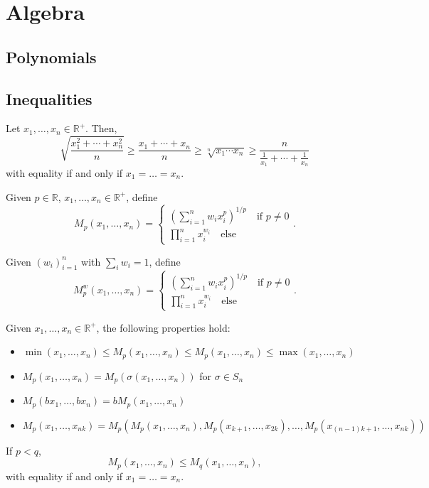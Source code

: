 \documentclass[11pt]{article}
\newcommand{\R}{\mathbb{R}}
\renewcommand{\>}{\rangle}
\newcommand{\<}{\langle}
\begin{document}
\pagebreak
\section{Algebra}
\subsection{Polynomials}
\subsection{Inequalities}
\begin{theorem}[QM-AM-GM-HM]
Let $x_1, \dots, x_n \in \R^+$.  Then,
\[\sqrt{\frac{x_1^2+\cdots+x_n^2}{n}} \ge\frac{x_1+\cdots+x_n}{n}\ge\sqrt[n]{x_1\cdots x_n}\ge\frac{n}{\frac{1}{x_1}+\cdots+\frac{1}{x_n}}\]
with equality if and only if $x_1 = \dots = x_n$.
\end{theorem}

\begin{definition} Given $p \in \R$, $x_1, \dots, x_n \in \R^+$, define 
$$M_p(x_1, \dots, x_n) = \begin{cases}\left (\sum_{i=1}^n w_i x_i^p \right)^{1/p} \quad \text{if } p \ne 0 \\ \prod_{i=1}^n x_i^{w_i} \quad \text{else} \end{cases}.$$
\end{definition}
\begin{definition} Given $(w_i)_{i=1}^n$ with $\sum_i w_i = 1$, define 
$$M_p^w(x_1, \dots, x_n) = \begin{cases}\left (\sum_{i=1}^n w_i x_i^p \right)^{1/p} \quad \text{if } p \ne 0 \\ \prod_{i=1}^n x_i^{w_i} \quad \text{else} \end{cases}.$$
\end{definition}
\begin{theorem}
Given $x_1, \dots, x_n \in \R^+$, the following properties hold:
\begin{itemize}
\item $\min(x_1, \dots, x_n) \le M_p(x_1, \dots, x_n) \le M_p(x_1, \dots, x_n) \le \max(x_1, \dots, x_n)$ 
\item $M_p(x_1, \dots, x_n) = M_p(\sigma(x_1, \dots, x_n))$ for $\sigma \in S_n$ 
\item $M_p(bx_1, \dots, bx_n) = b M_p(x_1, \dots, x_n)$
\item $M_p(x_1,\dots, x_{nk}) = M_p(M_p(x_1, \dots, x_n), M_p(x_{k+1}, \dots, x_{2k}), \dots, M_p(x_{(n-1)k + 1}, \dots, x_{nk}))$
\end{itemize}
\end{theorem}
\begin{theorem}
If $p < q$,
$$M_p(x_1, \dots, x_n) \le M_q(x_1, \dots, x_n),$$
with equality if and only if $x_1 = \dots = x_n$.
\end{theorem}
\end{document}
